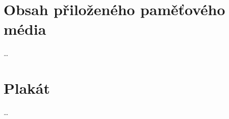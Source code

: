 \documentclass[english,odsaz]{fitthesis}
\begin{document}
\begin{flushleft}

\end{flushleft}
\iftwoside\cleardoublepage\fi

\appendix
\appendixpage
\iftwoside\cleardoublepage\fi

\startcontents[chapters]
\iftwoside\cleardoublepage\fi

\chapter{Obsah přiloženého paměťového média}
\label{sec-6}
\ldots{}
\chapter{Plakát}
\label{sec-7}
\ldots{}
\end{document}
